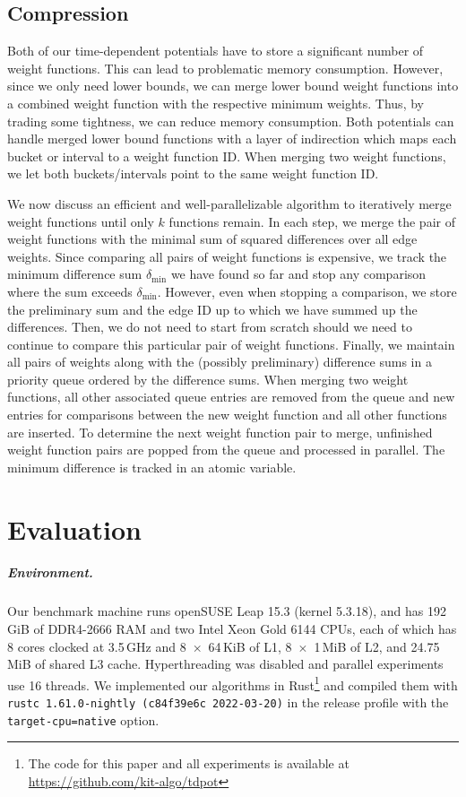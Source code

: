 \documentclass[a4paper,UKenglish,cleveref, autoref, thm-restate,anonymous]{lipics-v2021}
\begin{document}
\subsection{Compression}\label{sec:compression}

Both of our time-dependent potentials have to store a significant number of weight functions.
This can lead to problematic memory consumption.
However, since we only need lower bounds, we can merge lower bound weight functions into a combined weight function with the respective minimum weights.
Thus, by trading some tightness, we can reduce memory consumption.
Both potentials can handle merged lower bound functions with a layer of indirection which maps each bucket or interval to a weight function ID.
When merging two weight functions, we let both buckets/intervals point to the same weight function ID.

We now discuss an efficient and well-parallelizable algorithm to iteratively merge weight functions until only $k$ functions remain.
In each step, we merge the pair of weight functions with the minimal sum of squared differences over all edge weights.
Since comparing all pairs of weight functions is expensive, we track the minimum difference sum $\delta_{\min}$ we have found so far and stop any comparison where the sum exceeds $\delta_{\min}$.
However, even when stopping a comparison, we store the preliminary sum and the edge ID up to which we have summed up the differences.
Then, we do not need to start from scratch should we need to continue to compare this particular pair of weight functions.
Finally, we maintain all pairs of weights along with the (possibly preliminary) difference sums in a priority queue ordered by the difference sums.
When merging two weight functions, all other associated queue entries are removed from the queue and new entries for comparisons between the new weight function and all other functions are inserted.
To determine the next weight function pair to merge, unfinished weight function pairs are popped from the queue and processed in parallel.
The minimum difference is tracked in an atomic variable.

\section{Evaluation}
\subparagraph{Environment.} Our benchmark machine runs openSUSE Leap 15.3 (kernel 5.3.18), and has 192\,GiB of DDR4-2666 RAM and two Intel Xeon Gold 6144 CPUs, each of which has 8 cores clocked at 3.5\,GHz and 8~$\times$~64\,KiB of L1, 8~$\times$~1\,MiB of L2, and 24.75\,MiB of shared L3 cache.
Hyperthreading was disabled and parallel experiments use 16 threads.
We implemented our algorithms in Rust\footnote{The code for this paper and all experiments is available at \url{https://github.com/kit-algo/tdpot}} and compiled them with \texttt{rustc 1.61.0-nightly (c84f39e6c 2022-03-20)} in the release profile with the \texttt{target-cpu=native} option.
\end{document}
